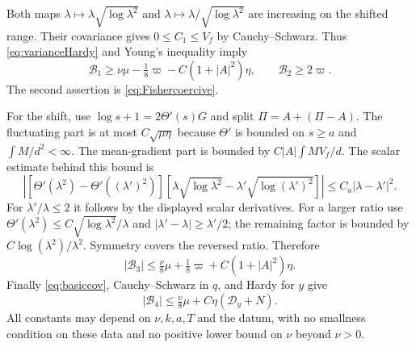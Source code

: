 \documentclass[11pt]{article}
\numberwithin{equation}{section}
\newcommand{\Dy}{\mathcal D_y}
\begin{document}
Both maps $\lambda\mapsto\lambda\sqrt{\log\lambda^2}$ and
$\lambda\mapsto\lambda/\sqrt{\log\lambda^2}$ are increasing on the shifted
range. Their covariance gives $0\leq C_1\leq V_f$ by Cauchy--Schwarz.
Thus \eqref{eq:varianceHardy} and Young's inequality imply
\begin{equation}\label{eq:B12bounds}
 \mathcal B_1\geq\nu\mu-\tfrac18\varpi-C(1+|A|^2)\eta,
 \qquad \mathcal B_2\geq2\varpi.
\end{equation}
The second assertion is \eqref{eq:Fishercoercive}.

For the shift, use $\log s+1=2\Theta'(s)G$ and split $\Pi=A+(\Pi-A)$.
The fluctuating part is at most $C\sqrt{\mu\eta}$ because $\Theta'$ is
bounded on $s\geq a$ and $\int M/d^2<\infty$. The mean-gradient part is
bounded by $C|A|\int MV_f/d$. The scalar estimate behind this bound is
\begin{equation}\label{eq:shiftpair}
 |[\Theta'(\lambda^2)-\Theta'((\lambda')^2)]
   [\lambda\sqrt{\log\lambda^2}-\lambda'\sqrt{\log(\lambda')^2}]|
       \leq C_a|\lambda-\lambda'|^2.
\end{equation}
For $\lambda'/\lambda\leq2$ it follows by the displayed scalar derivatives.
For a larger ratio use
$\Theta'(\lambda^2)\leq C\sqrt{\log\lambda^2}/\lambda$ and
$|\lambda'-\lambda|\geq\lambda'/2$; the remaining factor is bounded by
$C\log(\lambda^2)/\lambda^2$. Symmetry covers the reversed ratio.
Therefore
\begin{equation}\label{eq:B3bound}
 |\mathcal B_3|\leq\tfrac\nu8\mu+\tfrac18\varpi
                                     +C(1+|A|^2)\eta.
\end{equation}
Finally \eqref{eq:basiccov}, Cauchy--Schwarz in $q$, and Hardy for $y$ give
\begin{equation}\label{eq:B4bound}
 |\mathcal B_4|\leq\tfrac\nu8\mu+C\eta(\Dy+N).
\end{equation}
All constants may depend on $\nu,k,a,T$ and the datum, with no smallness
condition on these data and no positive lower bound on $\nu$ beyond $\nu>0$.
\end{document}
